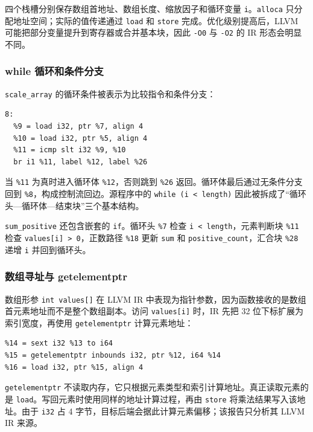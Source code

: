 \documentclass[a4paper]{article}
\begin{document}
四个栈槽分别保存数组首地址、数组长度、缩放因子和循环变量 \texttt{i}。\texttt{alloca} 只分配地址空间；实际的值传递通过 \texttt{load} 和 \texttt{store} 完成。优化级别提高后，LLVM 可能把部分变量提升到寄存器或合并基本块，因此 \texttt{-O0} 与 \texttt{-O2} 的 IR 形态会明显不同。

\subsubsection{while 循环和条件分支}

\texttt{scale\_array} 的循环条件被表示为比较指令和条件分支：

\begin{lstlisting}[language=LLVMIR,caption={scale\_array 的循环条件}]
8:
  %9 = load i32, ptr %7, align 4
  %10 = load i32, ptr %5, align 4
  %11 = icmp slt i32 %9, %10
  br i1 %11, label %12, label %26
\end{lstlisting}

当 \texttt{\%11} 为真时进入循环体 \texttt{\%12}，否则跳到 \texttt{\%26} 返回。循环体最后通过无条件分支回到 \texttt{\%8}，构成控制流回边。源程序中的 \texttt{while (i < length)} 因此被拆成了“循环头—循环体—结束块”三个基本结构。

\texttt{sum\_positive} 还包含嵌套的 \texttt{if}。循环头 \texttt{\%7} 检查 \texttt{i < length}，元素判断块 \texttt{\%11} 检查 \texttt{values[i] > 0}，正数路径 \texttt{\%18} 更新 \texttt{sum} 和 \texttt{positive\_count}，汇合块 \texttt{\%28} 递增 \texttt{i} 并回到循环头。

\subsubsection{数组寻址与 getelementptr}

数组形参 \texttt{int values[]} 在 LLVM IR 中表现为指针参数，因为函数接收的是数组首元素地址而不是整个数组副本。访问 \texttt{values[i]} 时，IR 先把 32 位下标扩展为索引宽度，再使用 \texttt{getelementptr} 计算元素地址：

\begin{lstlisting}[language=LLVMIR,caption={数组元素寻址}]
%13 = load i32, ptr %6, align 4
%14 = sext i32 %13 to i64
%15 = getelementptr inbounds i32, ptr %12, i64 %14
%16 = load i32, ptr %15, align 4
\end{lstlisting}

\texttt{getelementptr} 不读取内存，它只根据元素类型和索引计算地址。真正读取元素的是 \texttt{load}。写回元素时使用同样的地址计算过程，再由 \texttt{store} 将乘法结果写入该地址。由于 \texttt{i32} 占 4 字节，目标后端会据此计算元素偏移；该报告只分析其 LLVM IR 来源。
\end{document}
